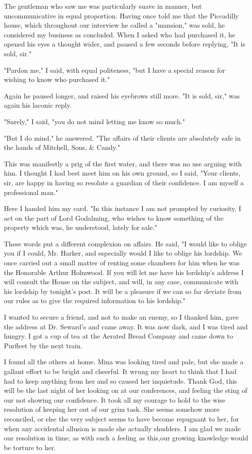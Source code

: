 The gentleman who saw me was particularly suave in manner, but uncommunicative in equal proportion. Having once told me that the Piccadilly house, which throughout our interview he called a "mansion," was sold, he considered my business as concluded. When I asked who had purchased it, he opened his eyes a thought wider, and paused a few seconds before replying, "It is sold, sir." 

"Pardon me," I said, with equal politeness, "but I have a special reason for wishing to know who purchased it." 

Again he paused longer, and raised his eyebrows still more. "It is sold, sir," was again his laconic reply. 

"Surely," I said, "you do not mind letting me know so much." 

"But I do mind," he answered. "The affairs of their clients are absolutely safe in the hands of Mitchell, Sons, \& Candy." 

This was manifestly a prig of the first water, and there was no use arguing with him. I thought I had best meet him on his own ground, so I said, "Your clients, sir, are happy in having so resolute a guardian of their confidence. I am myself a professional man." 

Here I handed him my card. "In this instance I am not prompted by curiosity, I act on the part of Lord Godalming, who wishes to know something of the property which was, he understood, lately for sale." 

These words put a different complexion on affairs. He said, "I would like to oblige you if I could, Mr. Harker, and especially would I like to oblige his lordship. We once carried out a small matter of renting some chambers for him when he was the Honorable Arthur Holmwood. If you will let me have his lordship's address I will consult the House on the subject, and will, in any case, communicate with his lordship by tonight's post. It will be a pleasure if we can so far deviate from our rules as to give the required information to his lordship." 

I wanted to secure a friend, and not to make an enemy, so I thanked him, gave the address at Dr. Seward's and came away. It was now dark, and I was tired and hungry. I got a cup of tea at the Aerated Bread Company and came down to Purfleet by the next train. 

I found all the others at home. Mina was looking tired and pale, but she made a gallant effort to be bright and cheerful. It wrung my heart to think that I had had to keep anything from her and so caused her inquietude. Thank God, this will be the last night of her looking on at our conferences, and feeling the sting of our not showing our confidence. It took all my courage to hold to the wise resolution of keeping her out of our grim task. She seems somehow more reconciled, or else the very subject seems to have become repugnant to her, for when any accidental allusion is made she actually shudders. I am glad we made our resolution in time, as with such a feeling as this,our growing knowledge would be torture to her. 

